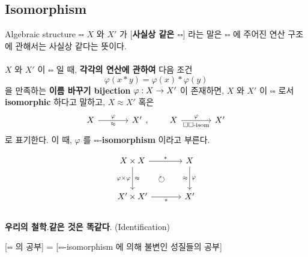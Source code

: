 \subsection{Isomorphism}
Algebraic structure $\square\square$ $X$ 와 $X'$ 가 [\textbf{사실상 같은 $\square\square$}] 라는 말은 $\square\square$ 에 주어진 연산 구조에 관해서는 사실상 같다는 뜻이다.\\
\\
 $X$ 와 $X'$ 이 $\square\square$ 일 때, \textbf{각각의 연산에 관하여} 다음 조건
$$\varphi(x\ast y) = \varphi(x)\ast \varphi(y)$$
을 만족하는 \textbf{이름 바꾸기 bijection} $\varphi:X\rightarrow X'$ 이 존재하면, $X$ 와 $X'$ 이 $\square\square$ 로서 \textbf{isomorphic} 하다고 말하고, $X \approx X'$ 혹은
$$
\begin{tikzcd}[column sep = large]
X\arrow[r, "\approx"', "\varphi"] & X'
\end{tikzcd}, \qquad 
\begin{tikzcd}[column sep = large]
X\arrow[r, "\square\square\text{-isom}"', "\varphi"] & X'
\end{tikzcd}
$$
로 표기한다. 이 때, $\varphi$ 를 $\square\square$-\textbf{isomorphism} 이라고 부른다.

$$
\begin{tikzcd}[row sep = large, column sep = large]
X\times X \arrow[r, "\ast"] \arrow[d, "\approx", "\varphi\times \varphi"']  \arrow[dr, phantom, "\circlearrowright"]
 & X \arrow[d, "\approx"', "\varphi"] \\
X'\times X' \arrow[r, "\ast"']& X'
\end{tikzcd}
$$
\\
\textbf{우리의 철학}.\quad \textbf{같은 것은 똑같다}. (Identification)
\\
\begin{center}
	[$\square\square$ 의 공부] = [$\square\square$-isomorphism 에 의해 불변인 성질들의 공부]
\end{center}
\pagebreak